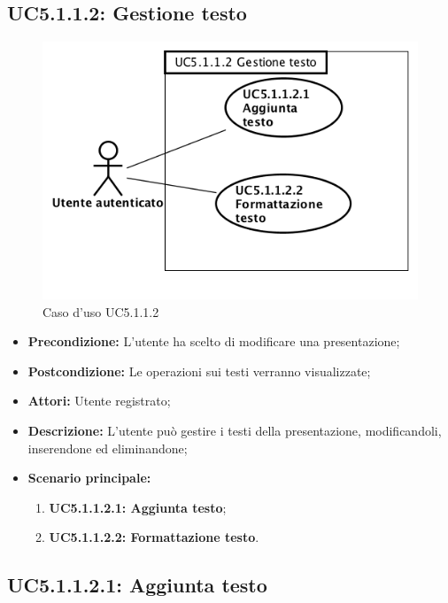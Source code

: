 \subsection{ UC5.1.1.2: Gestione testo}

\begin{figure}[h]
	\begin{center}
	\includegraphics[scale=0.4]{diagram/UC5-1-1-2.png}
	\caption{Caso d'uso UC5.1.1.2}
	\end{center}
\end{figure}
\begin{itemize}
	\item \textbf{Precondizione:} L'utente ha scelto di modificare una presentazione;
	\item \textbf{Postcondizione:} Le operazioni sui testi verranno visualizzate;
	\item \textbf{Attori:} Utente registrato;
	\item \textbf{Descrizione:} L'utente può gestire i testi della presentazione, modificandoli, inserendone ed eliminandone;
	\item \textbf{Scenario principale:}
	\begin{enumerate}
		\item \textbf{ UC5.1.1.2.1: Aggiunta testo};
		\item \textbf{ UC5.1.1.2.2: Formattazione testo}.
	\end{enumerate}
\end{itemize}
\subsection{ UC5.1.1.2.1: Aggiunta testo}

